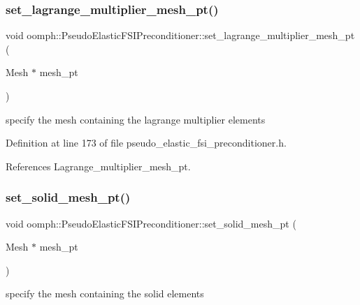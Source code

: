 \subsubsection{\texorpdfstring{set\+\_\+lagrange\+\_\+multiplier\+\_\+mesh\+\_\+pt()}{set\_lagrange\_multiplier\_mesh\_pt()}}
{\footnotesize\ttfamily void oomph\+::\+Pseudo\+Elastic\+F\+S\+I\+Preconditioner\+::set\+\_\+lagrange\+\_\+multiplier\+\_\+mesh\+\_\+pt (\begin{DoxyParamCaption}\item[{Mesh $\ast$}]{mesh\+\_\+pt }\end{DoxyParamCaption})\hspace{0.3cm}{\ttfamily [inline]}}



specify the mesh containing the lagrange multiplier elements 



Definition at line 173 of file pseudo\+\_\+elastic\+\_\+fsi\+\_\+preconditioner.\+h.



References Lagrange\+\_\+multiplier\+\_\+mesh\+\_\+pt.

\mbox{\label{classoomph_1_1PseudoElasticFSIPreconditioner_af2c1fc8d2dd795c5a4a2ae266ad32d18}} 
\subsubsection{\texorpdfstring{set\+\_\+solid\+\_\+mesh\+\_\+pt()}{set\_solid\_mesh\_pt()}}
{\footnotesize\ttfamily void oomph\+::\+Pseudo\+Elastic\+F\+S\+I\+Preconditioner\+::set\+\_\+solid\+\_\+mesh\+\_\+pt (\begin{DoxyParamCaption}\item[{Mesh $\ast$}]{mesh\+\_\+pt }\end{DoxyParamCaption})\hspace{0.3cm}{\ttfamily [inline]}}



specify the mesh containing the solid elements 



